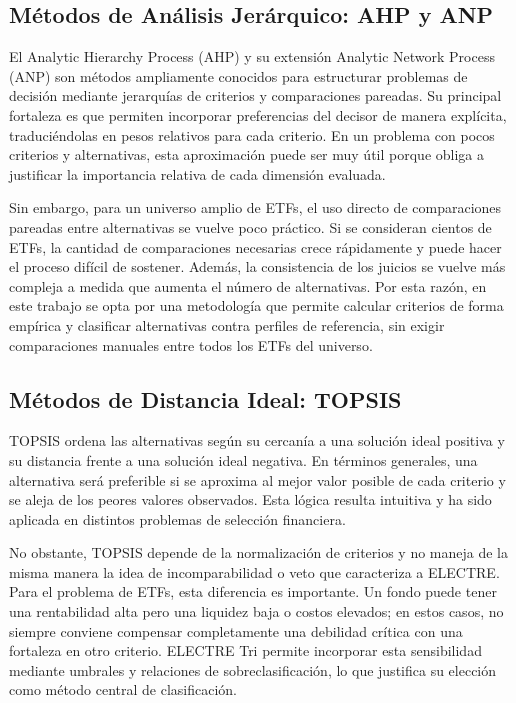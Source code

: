 \documentclass[12pt,letterpaper]{article}
\begin{document}
\subsection{Métodos de Análisis Jerárquico: AHP y ANP}

El Analytic Hierarchy Process (AHP) y su extensión Analytic Network Process (ANP) son métodos ampliamente conocidos para estructurar problemas de decisión mediante jerarquías de criterios y comparaciones pareadas. Su principal fortaleza es que permiten incorporar preferencias del decisor de manera explícita, traduciéndolas en pesos relativos para cada criterio. En un problema con pocos criterios y alternativas, esta aproximación puede ser muy útil porque obliga a justificar la importancia relativa de cada dimensión evaluada.

Sin embargo, para un universo amplio de ETFs, el uso directo de comparaciones pareadas entre alternativas se vuelve poco práctico. Si se consideran cientos de ETFs, la cantidad de comparaciones necesarias crece rápidamente y puede hacer el proceso difícil de sostener. Además, la consistencia de los juicios se vuelve más compleja a medida que aumenta el número de alternativas. Por esta razón, en este trabajo se opta por una metodología que permite calcular criterios de forma empírica y clasificar alternativas contra perfiles de referencia, sin exigir comparaciones manuales entre todos los ETFs del universo.

\subsection{Métodos de Distancia Ideal: TOPSIS}

TOPSIS ordena las alternativas según su cercanía a una solución ideal positiva y su distancia frente a una solución ideal negativa. En términos generales, una alternativa será preferible si se aproxima al mejor valor posible de cada criterio y se aleja de los peores valores observados. Esta lógica resulta intuitiva y ha sido aplicada en distintos problemas de selección financiera.

No obstante, TOPSIS depende de la normalización de criterios y no maneja de la misma manera la idea de incomparabilidad o veto que caracteriza a ELECTRE. Para el problema de ETFs, esta diferencia es importante. Un fondo puede tener una rentabilidad alta pero una liquidez baja o costos elevados; en estos casos, no siempre conviene compensar completamente una debilidad crítica con una fortaleza en otro criterio. ELECTRE Tri permite incorporar esta sensibilidad mediante umbrales y relaciones de sobreclasificación, lo que justifica su elección como método central de clasificación.
\end{document}
